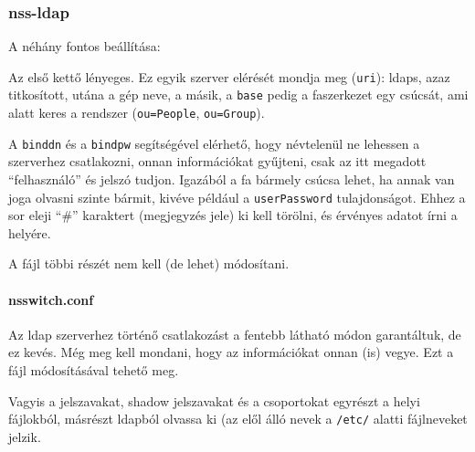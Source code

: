 \subsubsection{nss-ldap}
A  néhány fontos beállítása:


Az első kettő lényeges. Ez egyik szerver elérését mondja meg (\texttt{uri}): ldaps, azaz titkosított, utána a gép neve,
a másik, a \texttt{base} pedig a faszerkezet egy csúcsát, ami alatt keres a rendszer (\texttt{ou=People},
\texttt{ou=Group}).

A \texttt{binddn} és a \texttt{bindpw} segítségével elérhető, hogy névtelenül ne lehessen a szerverhez csatlakozni,
onnan információkat gyűjteni, csak az itt megadott ``felhasználó'' és jelszó tudjon. Igazából a fa bármely csúcsa
lehet, ha annak van joga olvasni szinte bármit, kivéve például a \texttt{userPassword} tulajdonságot. Ehhez a sor
eleji ``\#'' karaktert (megjegyzés jele) ki kell törölni, és érvényes adatot írni a helyére.

A fájl többi részét nem kell (de lehet) módosítani.


\paragraph{nsswitch.conf} Az ldap szerverhez történő csatlakozást a fentebb látható módon garantáltuk, de ez
kevés. Még meg kell mondani, hogy az információkat onnan (is) vegye. Ezt a  fájl
módosításával tehető meg.


Vagyis a jelszavakat, shadow jelszavakat és a csoportokat egyrészt a helyi fájlokból, másrészt ldapból olvassa ki (az
elől álló nevek a \texttt{/etc/} alatti fájlneveket jelzik.

